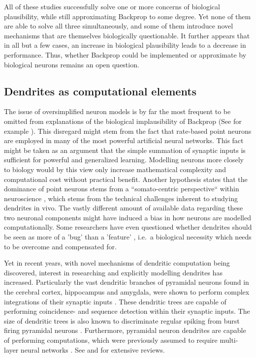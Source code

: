 \noindent All of these studies successfully solve one or more concerns of biological plausibility, while still
approximating Backprop to some degree. Yet none of them are able to solve all three simultaneously, and some of them
introduce novel mechanisms that are themselves biologically questionable. It further appears that in all but a few
cases, an increase in biological plausibility leads to a decrease in performance. Thus, whether Backprop could be
implemented or approximate by biological neurons remains an open question.

\subsection{Dendrites as computational elements}\label{sec-dendrites}

The issue of oversimplified neuron models is by far the most frequent to be omitted from explanations of the biological
implausibility of Backprop (See for example \citep{Meulemans2020,Lillicrap2014}). This disregard might stem from the
fact that rate-based point neurons are employed in many of the most powerful artificial neural networks. This fact might
be taken as an argument that the simple summation of synaptic inputs is sufficient for powerful and generalized
learning. Modelling neurons more closely to biology would by this view only increase mathematical complexity and
computational cost without practical benefit. Another hypothesis states that the dominance of point neurons stems from a
``somato-centric perspective`` within neuroscience \citep{Larkum2018}, which stems from the technical challenges inherent
to studying dendrites in vivo. The vastly different amount of available data regarding these two neuronal components
might have induced a bias in how neurons are modelled computationally. Some researchers have even questioned whether
dendrites should be seen as more of a 'bug' than a 'feature' \citep{Haeusser2003}, i.e.\ a biological necessity which
needs to be overcome and compensated for.

Yet in recent years, with novel mechanisms of dendritic computation being discovered, interest in researching and
explicitly modelling dendrites has increased. Particularly the vast dendritic branches of pyramidal neurons found in the
cerebral cortex, hippocampus and amygdala, were shown to perform complex integrations of their synaptic inputs
\citep{spruston2008pyramidal}. These dendritic trees are capable of performing coincidence- \citep{Larkum1999} and
sequence detection \citep{Branco2010} within their synaptic inputs. The size of dendritic trees is also known to
discriminate regular spiking from burst firing pyramidal neurons \citep{Elburg2010}. Furthermore, pyramidal neuron
dendrites are capable of performing computations, which were previously assumed to require multi-layer neural networks
\citep{Schiess2016,Gidon2020}. See \citep{Larkum2022} and \citep{Poirazi2020} for extensive reviews.

